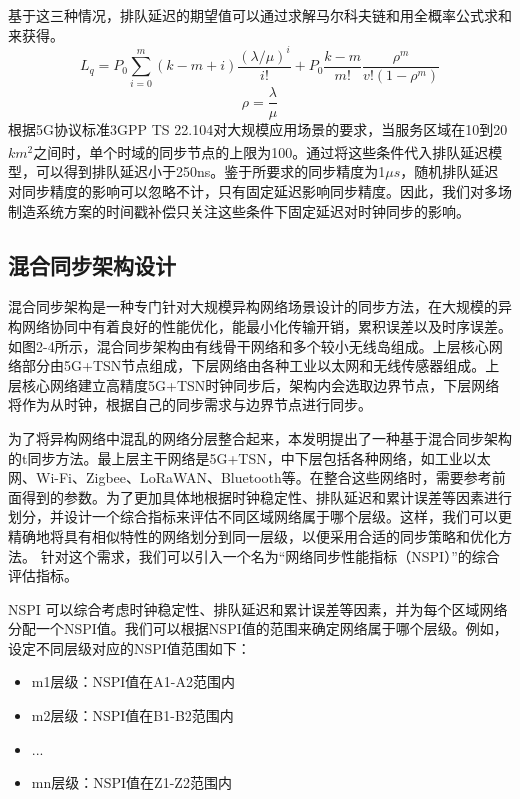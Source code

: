 \documentclass[UTF8,a4paper,12pt]{ctexart}
\numberwithin{equation}{section}
\begin{document}
基于这三种情况，排队延迟的期望值可以通过求解马尔科夫链和用全概率公式求和来获得。
\begin{equation*}
	L_q=P_0 \sum_{i=0}^m{\left(k-m+i\right) \frac{\left(\lambda/\mu\right)^i}{i!}+P_0 \frac{k-m}{m!} \frac{\rho^m}{v!\left(1-\rho^m\right)}}
\end{equation*}
\begin{equation}
	\rho=\frac{\lambda}{\mu}
\end{equation}
根据5G协议标准3GPP TS 22.104对大规模应用场景的要求，当服务区域在10到20$km^2$之间时，单个时域的同步节点的上限为100\textsuperscript{\cite{888889}}。通过将这些条件代入排队延迟模型，可以得到排队延迟小于250ns。鉴于所要求的同步精度为1$\mu s$，随机排队延迟对同步精度的影响可以忽略不计，只有固定延迟影响同步精度。因此，我们对多场制造系统方案的时间戳补偿只关注这些条件下固定延迟对时钟同步的影响。

\subsection{混合同步架构设计}

混合同步架构是一种专门针对大规模异构网络场景设计的同步方法，在大规模的异构网络协同中有着良好的性能优化，能最小化传输开销，累积误差以及时序误差。如图2-4所示，混合同步架构由有线骨干网络和多个较小无线岛组成。上层核心网络部分由5G+TSN节点组成，下层网络由各种工业以太网和无线传感器组成。上层核心网络建立高精度5G+TSN时钟同步后，架构内会选取边界节点，下层网络将作为从时钟，根据自己的同步需求与边界节点进行同步。

为了将异构网络中混乱的网络分层整合起来，本发明提出了一种基于混合同步架构的t同步方法。最上层主干网络是5G+TSN，中下层包括各种网络，如工业以太网、Wi-Fi、Zigbee、LoRaWAN、Bluetooth等。在整合这些网络时，需要参考前面得到的参数。为了更加具体地根据时钟稳定性、排队延迟和累计误差等因素进行划分，并设计一个综合指标来评估不同区域网络属于哪个层级。这样，我们可以更精确地将具有相似特性的网络划分到同一层级，以便采用合适的同步策略和优化方法。
针对这个需求，我们可以引入一个名为“网络同步性能指标（NSPI）”的综合评估指标。

NSPI 可以综合考虑时钟稳定性、排队延迟和累计误差等因素，并为每个区域网络分配一个NSPI值。我们可以根据NSPI值的范围来确定网络属于哪个层级。例如，设定不同层级对应的NSPI值范围如下：
\begin{itemize}
	\item m1层级：NSPI值在A1-A2范围内
	\item m2层级：NSPI值在B1-B2范围内
	\item ...
	\item mn层级：NSPI值在Z1-Z2范围内
\end{itemize}
\end{document}
